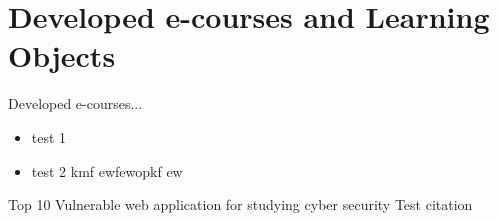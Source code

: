 \section{Developed e-courses and Learning Objects}
\label{Developed e-courses and Learning Objects}
Developed e-courses...
\begin{itemize}
	\item test 1
	\item test 2 kmf ewfewopkf ew
\end{itemize}

Top 10 Vulnerable web application for studying cyber security  \cite{url:pulse}
Test citation \cite{10VulnerApps} \cite{greenwade93}
